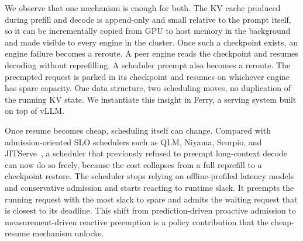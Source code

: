 We observe that one mechanism is enough for both. The KV cache produced during prefill and decode is append-only and small relative to the prompt itself, so it can be incrementally copied from GPU to host memory in the background and made visible to every engine in the cluster. Once such a checkpoint exists, an engine failure becomes a reroute. A peer engine reads the checkpoint and resumes decoding without reprefilling. A scheduler preempt also becomes a reroute. The preempted request is parked in its checkpoint and resumes on whichever engine has spare capacity. One data structure, two scheduling moves, no duplication of the running KV state. We instantiate this insight in Ferry, a serving system built on top of vLLM.


Once resume becomes cheap, scheduling itself can change. Compared with admission-oriented SLO schedulers such as QLM, Niyama, Scorpio, and JITServe~\cite{qlm,niyama,scorpio,jitserve}, a scheduler that previously refused to preempt long-context decode can now do so freely, because the cost collapses from a full reprefill to a checkpoint restore. The scheduler stops relying on offline-profiled latency models and conservative admission and starts reacting to runtime slack. It preempts the running request with the most slack to spare and admits the waiting request that is closest to its deadline. This shift from prediction-driven proactive admission to measurement-driven reactive preemption is a policy contribution that the cheap-resume mechanism unlocks.



